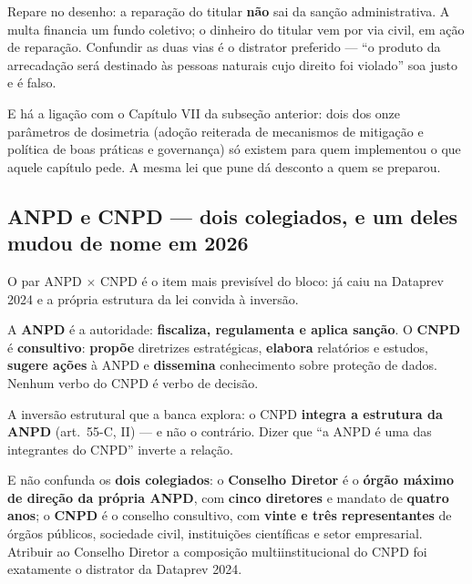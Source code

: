 Repare no desenho: a reparação do titular \textbf{não} sai da sanção
administrativa. A multa financia um fundo coletivo; o dinheiro do titular vem
por via civil, em ação de reparação. Confundir as duas vias é o distrator
preferido --- ``o produto da arrecadação será destinado às pessoas naturais
cujo direito foi violado'' soa justo e é falso.

E há a ligação com o Capítulo VII da subseção anterior: dois dos onze
parâmetros de dosimetria (adoção reiterada de mecanismos de mitigação e
política de boas práticas e governança) só existem para quem implementou o que
aquele capítulo pede. A mesma lei que pune dá desconto a quem se preparou.

\subsection{ANPD e CNPD --- dois colegiados, e um deles mudou de nome em 2026}

O par ANPD $\times$ CNPD é o item mais previsível do bloco: já caiu na
Dataprev 2024 e a própria estrutura da lei convida à inversão.

\begin{conceito}
A \textbf{ANPD} é a autoridade: \textbf{fiscaliza, regulamenta e aplica
sanção}. O \textbf{CNPD} é \textbf{consultivo}: \textbf{propõe} diretrizes
estratégicas, \textbf{elabora} relatórios e estudos, \textbf{sugere ações} à
ANPD e \textbf{dissemina} conhecimento sobre proteção de dados. Nenhum verbo
do CNPD é verbo de decisão.

A inversão estrutural que a banca explora: o CNPD \textbf{integra a estrutura
da ANPD} (art.\ 55-C, II) --- e não o contrário. Dizer que ``a ANPD é uma das
integrantes do CNPD'' inverte a relação.

E não confunda os \textbf{dois colegiados}: o \textbf{Conselho Diretor} é o
\textbf{órgão máximo de direção da própria ANPD}, com \textbf{cinco
diretores} e mandato de \textbf{quatro anos}; o \textbf{CNPD} é o conselho
consultivo, com \textbf{vinte e três representantes} de órgãos públicos,
sociedade civil, instituições científicas e setor empresarial. Atribuir ao
Conselho Diretor a composição multiinstitucional do CNPD foi exatamente o
distrator da Dataprev 2024.
\end{conceito}


